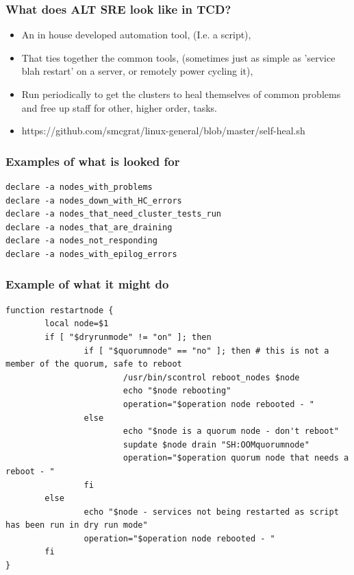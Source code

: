 \documentclass{beamer}
\begin{document}
\begin{frame}
\frametitle{What does ALT SRE look like in TCD?}
\begin{itemize}
	\item An in house developed automation tool, (I.e. a script),
	\item That ties together the common tools, (sometimes just as simple as 'service blah restart' on a server, or remotely power cycling it), 
	\item Run periodically to get the clusters to heal themselves of common problems and free up staff for other, higher order, tasks.
	\item https://github.com/smcgrat/linux-general/blob/master/self-heal.sh
\end{itemize}
\end{frame}

\begin{frame}[fragile]
\frametitle{Examples of what is looked for}
\begin{verbatim}
declare -a nodes_with_problems
declare -a nodes_down_with_HC_errors
declare -a nodes_that_need_cluster_tests_run
declare -a nodes_that_are_draining
declare -a nodes_not_responding
declare -a nodes_with_epilog_errors
\end{verbatim}
\end{frame}

\begin{frame}[fragile]
\frametitle{Example of what it might do}
\begin{lstlisting}[basicstyle=\tiny,]
function restartnode {
        local node=$1
        if [ "$dryrunmode" != "on" ]; then
                if [ "$quorumnode" == "no" ]; then # this is not a member of the quorum, safe to reboot
                        /usr/bin/scontrol reboot_nodes $node
                        echo "$node rebooting"
                        operation="$operation node rebooted - "
                else 
                        echo "$node is a quorum node - don't reboot"
                        supdate $node drain "SH:OOMquorumnode"
                        operation="$operation quorum node that needs a reboot - "
                fi
        else
                echo "$node - services not being restarted as script has been run in dry run mode"
                operation="$operation node rebooted - "
        fi
}
\end{lstlisting}
\end{frame}
\end{document}
